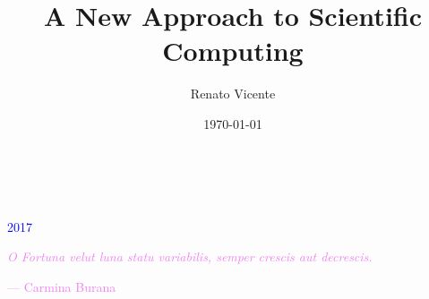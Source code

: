\documentclass[paper=9in:6in,pagesize=pdftex,headinclude=on,footinclude=on,10pt,bibtotoc,pointlessnumbers,normalheadings,DIV=9,twoside=false]{scrbook}
\title{A New Approach to Scientific Computing}
\author{Renato Vicente}
\date{\today}
\theoremstyle{plain}
\theoremstyle{definition}
\theoremstyle{remark}
\begin{document}
\graphicspath{{figs/}}  
\begin{titlepage}
		\\
			
		\vspace{10mm}
		\\
		\vspace{\fill}
		\centering 	\textcolor{blue}{\large{2017}}
\end{titlepage}


\newpage{}
\thispagestyle {empty}

\vspace*{2cm}

\begin{center}
	\Large{\parbox{10cm}{
		\begin{raggedright}
		{\Large 
			\textcolor{violet}{	\textit{O Fortuna velut luna statu variabilis, semper crescis
             aut decrescis.}}
		}
	
		\vspace{.5cm}\hfill{\textcolor{violet}{--- Carmina Burana}}
		\end{raggedright}
	}
}	
\end{center}

\newpage





\tableofcontents  



\end{document}
